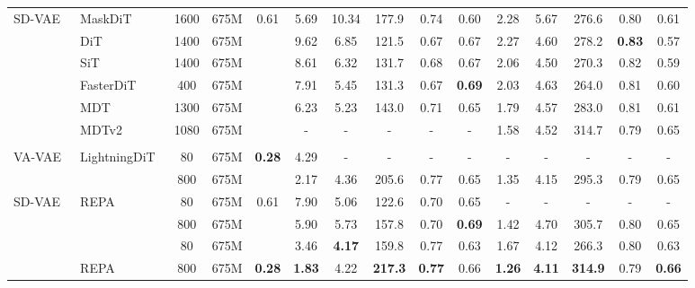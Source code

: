 \documentclass[10pt,twocolumn,letterpaper]{article}
\begin{document}
\begin{table*}[ht!]
{\begin{tabular}{l|l|c|c|c|ccccc|ccccc}
\rowcolor{blue!8}\multicolumn{15}{c}{\textbf{Latent Diffusion Models (LDM)}} \\
\midrule
\multirow{6}{*}{SD-VAE~\cite{ldm}} & MaskDiT~\cite{maskdit} & 1600 & 675M  & \multirow{6}{*}{0.61} & 5.69 & 10.34 & 177.9 & 0.74 & 0.60 & 2.28 & 5.67 & 276.6 & 0.80 & 0.61 \\ 
                 &   DiT~\cite{dit}        & 1400 & 675M & & 9.62 & 6.85  & 121.5  & 0.67 & 0.67 & 2.27 & 4.60 & 278.2 & \textbf{0.83} & 0.57 \\
                 &   SiT~\cite{sit}        & 1400 & 675M & & 8.61 & 6.32  & 131.7  & 0.68 & 0.67 & 2.06 & 4.50 & 270.3 & 0.82 & 0.59 \\
                 &   FasterDiT~\cite{fasterdit} & 400 & 675M & & 7.91 & 5.45  & 131.3  & 0.67 & \textbf{0.69} & 2.03 & 4.63 & 264.0 & 0.81 & 0.60 \\
                 &   MDT~\cite{mdt}        & 1300 & 675M & & 6.23 & 5.23  & 143.0  & 0.71 & 0.65 & 1.79 & 4.57 & 283.0 & 0.81 & 0.61 \\
                 &   MDTv2~\cite{mdtv2}      & 1080 & 675M & & -    & -     & -      & -    & -    & 1.58 & 4.52 & 314.7 & 0.79 & 0.65 \\
\midrule
\rowcolor{blue!8}\multicolumn{15}{c}{\textbf{Representation Alignment Methods}} \\
\midrule
\multirow{2}{*}{VA-VAE~\cite{ldit}} & \multirow{2}{*}{LightningDiT~\cite{ldit}} & 80 & 675M & \multirow{2}{*}{\textbf{0.28}} & 4.29 & - & - & - & - & - & - & - & - & - \\
                                  &                              & 800 & 675M & & 2.17 & 4.36       & 205.6       & 0.77       & 0.65       & 1.35       & 4.15       & 295.3       & 0.79       & 0.65 \\
\midrule
\multirow{2}{*}{SD-VAE} & \multirow{2}{*}{REPA~\cite{repa}} & 80  & 675M  & \multirow{2}{*}{0.61} & 7.90 & 5.06 & 122.6 & 0.70 & 0.65 & -    & -    & -    & -    & - \\
&  & 800 & 675M &  &  5.90 & 5.73 & 157.8 & 0.70 & \textbf{0.69} & 1.42 & 4.70 & 305.7 & 0.80 & 0.65 \\
\cmidrule{1-15}
 \rowcolor{yellow!10} &  & 80  & 675M &  & 3.46 & \textbf{4.17} & 159.8 & 0.77 & 0.63 & 1.67 & 4.12 & 266.3 & 0.80 & 0.63 \\
 \rowcolor{yellow!10} \multirow{-2}{*}{\textbf{E2E-VAE (Ours)}} &  \multirow{-2}{*}{REPA} &  800 & 675M & \multirow{-2}{*}{\textbf{0.28}} & \textbf{1.83} & 4.22 & \textbf{217.3} & \textbf{0.77} & 0.66 & \textbf{1.26} & \textbf{4.11} & \textbf{314.9} & 0.79 & \textbf{0.66} \\

\end{tabular}}
\end{table*}
\end{document}
